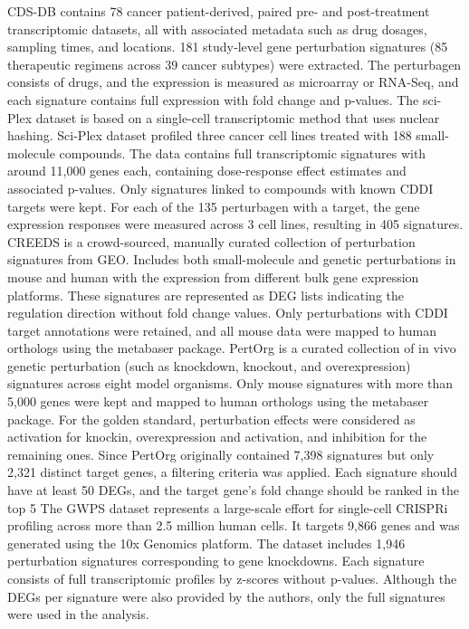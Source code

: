 CDS-DB contains 78 cancer patient-derived, paired pre- and post-treatment transcriptomic datasets, all with associated metadata such as drug dosages, sampling times, and locations. 181 study‐level gene perturbation signatures (85 therapeutic regimens across 39 cancer subtypes) were extracted. The perturbagen consists of drugs, and the expression is measured as microarray or RNA-Seq, and each signature contains full expression with fold change and p-values. 
The sci-Plex dataset is based on a single-cell transcriptomic method that uses nuclear hashing. Sci-Plex dataset profiled three cancer cell lines treated with 188 small-molecule compounds. The data contains full transcriptomic signatures with around 11,000 genes each, containing dose-response effect estimates and associated p-values. Only signatures linked to compounds with known CDDI targets were kept. For each of the 135 perturbagen with a target, the gene expression responses were measured across 3 cell lines, resulting in 405 signatures. 
CREEDS is a crowd-sourced, manually curated collection of perturbation signatures from GEO. Includes both small-molecule and genetic perturbations in mouse and human with the expression from different bulk gene expression platforms. These signatures are represented as DEG lists indicating the regulation direction without fold change values. Only perturbations with CDDI target annotations were retained, and all mouse data were mapped to human orthologs using the metabaser package.
PertOrg is a curated collection of in vivo genetic perturbation (such as knockdown, knockout, and overexpression) signatures across eight model organisms. Only mouse signatures with more than 5,000 genes were kept and mapped to human orthologs using the metabaser package. For the golden standard, perturbation effects were considered as activation for knockin, overexpression and activation, and inhibition for the remaining ones. Since PertOrg originally contained 7,398 signatures but only 2,321 distinct target genes, a filtering criteria was applied. Each signature should have at least 50 DEGs, and the target gene’s fold change should be ranked in the top 5%
The GWPS dataset represents a large-scale effort for single-cell CRISPRi profiling across more than 2.5 million human cells. It targets 9,866 genes and was generated using the 10x Genomics platform. The dataset includes 1,946 perturbation signatures corresponding to gene knockdowns. Each signature consists of full transcriptomic profiles by z-scores without p-values. Although the DEGs per signature were also provided by the authors, only the full signatures were used in the analysis.

